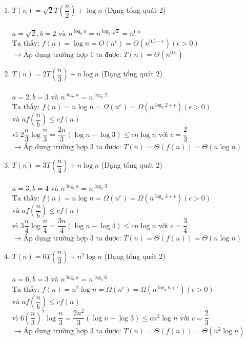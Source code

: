 \documentclass[12pt, letterpaper]{article}
\begin{document}
\begin{enumerate}[label=\bfseries\large\theenumi.]
    \item $ T(n) = \sqrt{2} T\left( \dfrac{n}{2} \right) + \log n $ (Dạng tổng quát 2) \\ \\
        $ a = \sqrt{2}, b = 2 \text{ và } n^{\log_b a} = n^{\log_2 \sqrt{2}} = n^{0.5} $ \\
        $ \text{Ta thấy: } f(n) = \log n = O(n^c) = O(n^{0.5 - \epsilon}) (\epsilon > 0) $ \\
        $ \rightarrow \text{Áp dụng trường hợp 1 ta được: } T(n) = \Theta(n^{0.5}) $

    \item $ T(n) = 2T\left( \dfrac{n}{3} \right) + n \log n $ (Dạng tổng quát 2) \\ \\
        $ a = 2, b = 3 \text{ và } n^{\log_b a} = n^{\log_3 2} $ \\
        $ \text{Ta thấy: } f(n) = n \log n = \Omega(n^c) = \Omega(n^{\log_3 2 + \epsilon}) (\epsilon > 0) $ \\
        $ \text{và } af\left(\dfrac{n}{b}\right) \leq cf(n) $ \\
        $ \text{vì } 2\dfrac{n}{3} \log \dfrac{n}{3} = \dfrac{2n}{3}(\log n - \log 3) \leq c n \log n \text{ với } c = \dfrac{2}{3} $ \\
        $ \rightarrow \text{Áp dụng trường hợp 3 ta được: } T(n) = \Theta(f(n)) = \Theta(n \log n) $

    \item $ T(n) = 3T\left( \dfrac{n}{4} \right) + n \log n $ (Dạng tổng quát 2) \\ \\
        $ a = 3, b = 4 \text{ và } n^{\log_b a} = n^{\log_4 3} $ \\
        $ \text{Ta thấy: } f(n) = n \log n = \Omega(n^c) = \Omega(n^{\log_4 3 + \epsilon}) (\epsilon > 0) $ \\
        $ \text{và } af\left(\dfrac{n}{b}\right) \leq cf(n) $ \\
        $ \text{vì } 3\dfrac{n}{4} \log \dfrac{n}{4} = \dfrac{3n}{4}(\log n - \log 4) \leq c n \log n \text{ với } c = \dfrac{3}{4} $ \\
        $ \rightarrow \text{Áp dụng trường hợp 3 ta được: } T(n) = \Theta(f(n)) = \Theta(n \log n) $

    \item $ T(n) = 6T\left( \dfrac{n}{3} \right) + n^2 \log n $ (Dạng tổng quát 2) \\ \\
        $ a = 6, b = 3 \text{ và } n^{\log_b a} = n^{\log_3 6} $ \\
        $ \text{Ta thấy: } f(n) = n^2 \log n = \Omega(n^c) = \Omega(n^{\log_3 6 + \epsilon}) (\epsilon > 0) $ \\
        $ \text{và } af\left(\dfrac{n}{b}\right) \leq cf(n) $ \\
        $ \text{vì } 6{(\dfrac{n}{3})}^2 \log \dfrac{n}{3} = \dfrac{2n^2}{3}(\log n - \log 3) \leq c n^2 \log n \text{ với } c = \dfrac{2}{3} $ \\
        $ \rightarrow \text{Áp dụng trường hợp 3 ta được: } T(n) = \Theta(f(n)) = \Theta(n^2 \log n) $


\end{enumerate}
\end{document}
